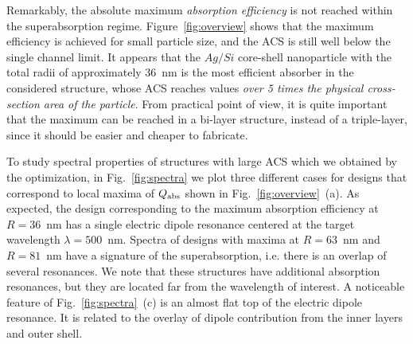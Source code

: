 \documentclass[aps,prl,twocolumn,showpacs,superscriptaddress,groupedaddress]{revtex4-1}
\begin{document}
Remarkably, the absolute maximum {\em absorption efficiency} is not
reached within the superabsorption regime. Figure~\ref{fig:overview}
shows that the maximum efficiency is achieved for small particle size,
and the ACS is still well below the single channel limit. It appears
that the $Ag/Si$ core-shell nanoparticle with the total radii of
approximately 36~nm is the most efficient absorber in the considered
structure, whose ACS reaches values {\em over 5 times the physical
  cross-section area of the particle}.  From practical point of view,
it is quite important that the maximum can be reached in a bi-layer
structure, instead of a triple-layer, since it should be easier and
cheaper to fabricate.

\begin{figure}
\end{figure}
To study spectral properties of structures with large ACS which we
obtained by the optimization, in Fig.~\ref{fig:spectra} we plot three
different cases for designs that correspond to local maxima of $Q_{\rm
  abs}$ shown in Fig.~\ref{fig:overview}~(a).  As expected, the design
corresponding to the maximum absorption efficiency at $R=36$~nm has a
single electric dipole resonance centered at the target wavelength
$\lambda=500$~nm. Spectra of designs with maxima at $R=63$~nm and
$R=81$~nm have a signature of the superabsorption, i.e. there is an
overlap of several resonances.  We note that these structures have
additional absorption resonances, but they are located far from the
wavelength of interest.  A noticeable feature of
Fig.~\ref{fig:spectra}~(c) is an almost flat top of the electric
dipole resonance.  It is related to the overlay of dipole contribution
from the inner layers and outer shell.
\end{document}
